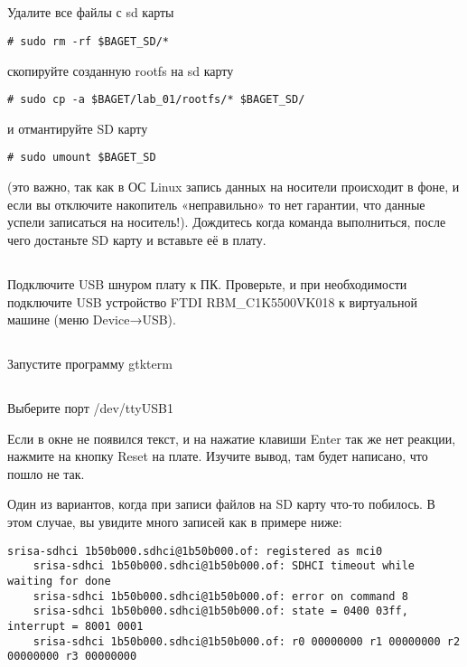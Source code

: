 \subsection{}Удалите все файлы с sd карты
\begin{lstlisting}[style=bash]
	# sudo rm -rf $BAGET_SD/*
\end{lstlisting}
скопируйте созданную rootfs на sd карту
\begin{lstlisting}[style=bash]
	# sudo cp -a $BAGET/lab_01/rootfs/* $BAGET_SD/
\end{lstlisting}
и отмантируйте SD карту 
\begin{lstlisting}[style=bash]
	# sudo umount $BAGET_SD
\end{lstlisting}
(это важно, так как в ОС Linux запись данных на носители происходит в фоне, и если вы отключите накопитель «неправильно» то нет гарантии, что данные успели записаться на носитель!).
Дождитесь когда команда выполниться, после чего достаньте SD карту и вставьте её в плату.

\subsection{}Подключите USB шнуром плату к ПК. Проверьте, и при необходимости подключите USB устройство FTDI RBM\_C1K5500VK018 к виртуальной машине (меню Device→USB).

\subsection{} Запустите программу gtkterm 

\subsection{} Выберите порт /dev/ttyUSB1 

Если в окне не появился текст, и на нажатие клавиши Enter так же нет реакции,  нажмите на кнопку Reset на плате. Изучите вывод, там будет написано, что пошло не так.

Один из вариантов, когда при записи файлов на SD карту что-то побилось. В этом случае, вы увидите много записей как в примере ниже:
\begin{lstlisting}[style=stdout]
	srisa-sdhci 1b50b000.sdhci@1b50b000.of: registered as mci0
	srisa-sdhci 1b50b000.sdhci@1b50b000.of: SDHCI timeout while waiting for done
	srisa-sdhci 1b50b000.sdhci@1b50b000.of: error on command 8
	srisa-sdhci 1b50b000.sdhci@1b50b000.of: state = 0400 03ff, interrupt = 8001 0001
	srisa-sdhci 1b50b000.sdhci@1b50b000.of: r0 00000000 r1 00000000 r2 00000000 r3 00000000
\end{lstlisting}

